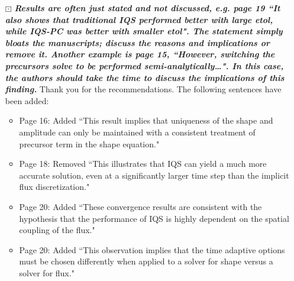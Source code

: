 \documentclass{elsarticle}
\newcommand{\working}{$\boxdot$}
\newcommand{\medm}[1]{\textbf{\textit{#1}}}
\begin{document}
\begin{itemize}
\item[\working] \medm{  Results are often just stated and not discussed, e.g. page 19 ``It also shows that traditional IQS performed better with large etol, while IQS-PC was better with smaller etol". The statement simply bloats the manuscripts; discuss the reasons and implications or remove it. Another example is page 15, ``However, switching the precursors solve to be performed semi-analytically…".  In this case, the authors should take the time to discuss the implications of this finding. }
Thank you for the recommendations. The following sentences have been added:
\begin{itemize}
\item Page 16: Added ``This result implies that uniqueness of the shape and amplitude can only be maintained with a consistent treatment of precursor term in the shape equation."
\item Page 18: Removed ``This illustrates that IQS can yield a much more accurate solution, even at a significantly larger time step than the implicit flux discretization."
\item Page 20: Added ``These convergence results are consistent with the hypothesis that the performance of IQS is highly dependent on the spatial coupling of the flux."
\item Page 20: Added ``This observation implies that the time adaptive options must be chosen differently when applied to a solver for shape versus a solver for flux."
\end{itemize}


\end{itemize}
\end{document}
